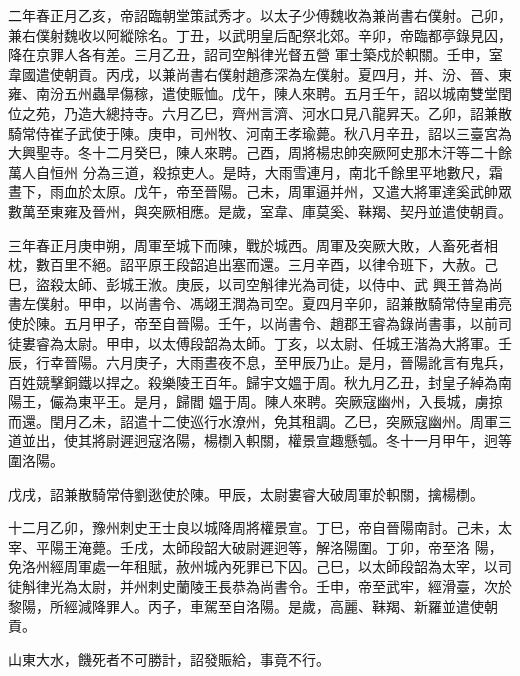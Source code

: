 \begin{pinyinscope}
 二年春正月乙亥，帝詔臨朝堂策試秀才。以太子少傅魏收為兼尚書右僕射。己卯，兼右僕射魏收以阿縱除名。丁丑，以武明皇后配祭北郊。辛卯，帝臨都亭錄見囚，降在京罪人各有差。三月乙丑，詔司空斛律光督五營
 軍士築戍於軹關。壬申，室韋國遣使朝貢。丙戌，以兼尚書右僕射趙彥深為左僕射。夏四月，并、汾、晉、東雍、南汾五州蟲旱傷稼，遣使賑恤。戊午，陳人來聘。五月壬午，詔以城南雙堂閏位之苑，乃造大總持寺。六月乙巳，齊州言濟、河水口見八龍昇天。乙卯，詔兼散騎常侍崔子武使于陳。庚申，司州牧、河南王孝瑜薨。秋八月辛丑，詔以三臺宮為大興聖寺。冬十二月癸巳，陳人來聘。己酉，周將楊忠帥突厥阿史那木汗等二十餘萬人自恒州
 分為三道，殺掠吏人。是時，大雨雪連月，南北千餘里平地數尺，霜晝下，雨血於太原。戊午，帝至晉陽。己未，周軍逼并州，又遣大將軍達奚武帥眾數萬至東雍及晉州，與突厥相應。是歲，室韋、庫莫奚、靺羯、契丹並遣使朝貢。



 三年春正月庚申朔，周軍至城下而陳，戰於城西。周軍及突厥大敗，人畜死者相枕，數百里不絕。詔平原王段韶追出塞而還。三月辛酉，以律令班下，大赦。己巳，盜殺太師、彭城王浟。庚辰，以司空斛律光為司徒，以侍中、武
 興王普為尚書左僕射。甲申，以尚書令、馮翊王潤為司空。夏四月辛卯，詔兼散騎常侍皇甫亮使於陳。五月甲子，帝至自晉陽。壬午，以尚書令、趙郡王睿為錄尚書事，以前司徒婁睿為太尉。甲申，以太傅段韶為太師。丁亥，以太尉、任城王湝為大將軍。壬辰，行幸晉陽。六月庚子，大雨晝夜不息，至甲辰乃止。是月，晉陽訛言有鬼兵，百姓競擊銅鐵以捍之。殺樂陵王百年。歸宇文媼于周。秋九月乙丑，封皇子綽為南陽王，儼為東平王。是月，歸閻
 媼于周。陳人來聘。突厥寇幽州，入長城，虜掠而還。閏月乙未，詔遣十二使巡行水潦州，免其租調。乙巳，突厥寇幽州。周軍三道並出，使其將尉遲迥寇洛陽，楊檦入軹關，權景宣趣懸瓠。冬十一月甲午，迥等圍洛陽。



 戊戌，詔兼散騎常侍劉逖使於陳。甲辰，太尉婁睿大破周軍於軹關，擒楊檦。



 十二月乙卯，豫州刺史王士良以城降周將權景宣。丁巳，帝自晉陽南討。己未，太宰、平陽王淹薨。壬戌，太師段韶大破尉遲迥等，解洛陽圍。丁卯，帝至洛
 陽，免洛州經周軍處一年租賦，赦州城內死罪已下囚。己巳，以太師段韶為太宰，以司徒斛律光為太尉，并州刺史蘭陵王長恭為尚書令。壬申，帝至武牢，經滑臺，次於黎陽，所經減降罪人。丙子，車駕至自洛陽。是歲，高麗、靺羯、新羅並遣使朝貢。



 山東大水，饑死者不可勝計，詔發賑給，事竟不行。




\end{pinyinscope}
